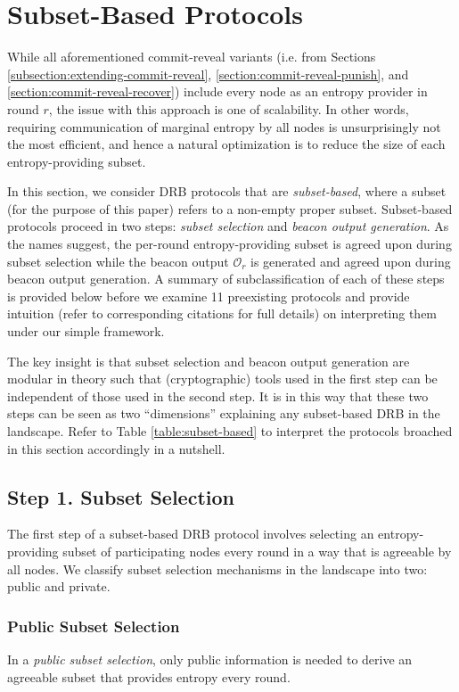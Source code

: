 \documentclass[letterpaper,twocolumn,10pt]{article}
\theoremstyle{definition}
\theoremstyle{remark}
\begin{document}
\section{Subset-Based Protocols}
\label{section:subset-based}
While all aforementioned commit-reveal variants (i.e. from Sections \ref{subsection:extending-commit-reveal}, \ref{section:commit-reveal-punish}, and \ref{section:commit-reveal-recover}) include every node as an entropy provider in round $r$, the issue with this approach is one of scalability. In other words, requiring communication of marginal entropy by all nodes is unsurprisingly not the most efficient, and hence a natural optimization is to reduce the size of each entropy-providing subset.

In this section, we consider DRB protocols that are \textit{subset-based}, where a subset (for the purpose of this paper) refers to a non-empty proper subset. Subset-based protocols proceed in two steps: \textit{subset selection} and \textit{beacon output generation}. As the names suggest, the per-round entropy-providing subset is agreed upon during subset selection while the beacon output $\mathcal{O}_r$ is generated and agreed upon during beacon output generation. A summary of subclassification of each of these steps is provided below before we examine 11 preexisting protocols and provide intuition (refer to corresponding citations for full details) on interpreting them under our simple framework.

The key insight is that subset selection and beacon output generation are modular in theory such that (cryptographic) tools used in the first step can be independent of those used in the second step. It is in this way that these two steps can be seen as two ``dimensions'' explaining any subset-based DRB in the landscape. Refer to Table \ref{table:subset-based} to interpret the protocols broached in this section accordingly in a nutshell.

\subsection{Step 1. Subset Selection}
The first step of a subset-based DRB protocol involves selecting an entropy-providing subset of participating nodes every round in a way that is agreeable by all nodes. We classify subset selection mechanisms in the landscape into two: public and private.

\subsubsection{Public Subset Selection}
\label{subsubsection:public-subset-selection}
In a \textit{public subset selection}, only public information is needed to derive an agreeable subset that provides entropy every round.\\
\end{document}
